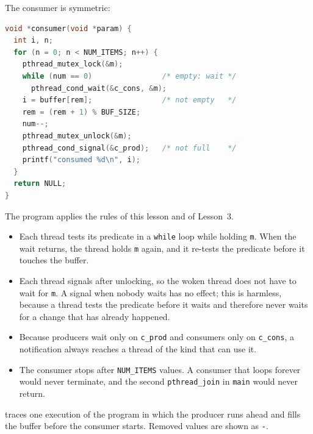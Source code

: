 \documentclass[../main.tex]{subfiles}
\begin{document}
The consumer is symmetric:
\begin{lstlisting}[language=C, numbers=none]
void *consumer(void *param) {
  int i, n;
  for (n = 0; n < NUM_ITEMS; n++) {
    pthread_mutex_lock(&m);
    while (num == 0)                /* empty: wait */
      pthread_cond_wait(&c_cons, &m);
    i = buffer[rem];                /* not empty   */
    rem = (rem + 1) % BUF_SIZE;
    num--;
    pthread_mutex_unlock(&m);
    pthread_cond_signal(&c_prod);   /* not full    */
    printf("consumed %d\n", i);
  }
  return NULL;
}
\end{lstlisting}

The program applies the rules of this lesson and of Lesson~3.
\begin{itemize}
  \item Each thread tests its predicate in a \texttt{while} loop while
    holding \texttt{m}.  When the wait returns, the thread holds \texttt{m}
    again, and it re-tests the predicate before it touches the buffer.
  \item Each thread signals after unlocking, so the woken thread does not
    have to wait for \texttt{m}.
    A signal when nobody waits has no effect;
    this is harmless, because a thread tests the predicate before it waits
    and therefore never waits for a change that has already happened.
  \item Because producers wait only on \texttt{c\_prod} and consumers only
    on \texttt{c\_cons}, a notification always reaches a thread of the kind
    that can use it.
  \item The consumer stops after \texttt{NUM\_ITEMS} values.  A consumer
    that loops forever would never terminate, and the second
    \texttt{pthread\_join} in \texttt{main} would never return.
\end{itemize}

\begin{example}
   traces one execution of the program in
  which the producer runs ahead and fills the buffer before the consumer
  starts.  Removed values are shown as \texttt{-}.
\end{example}
\end{document}

